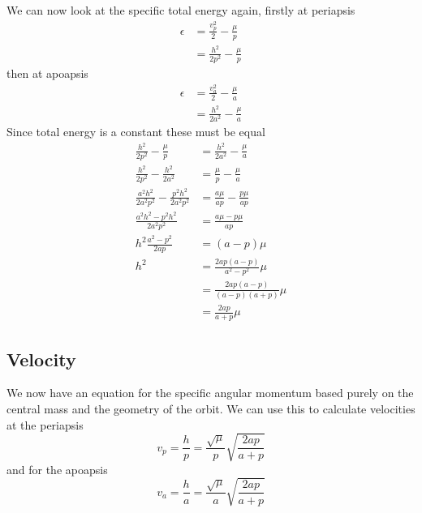 We can now look at the specific total energy again, firstly at periapsis
\begin{align}
\epsilon &= \frac{v_p^2}{2}-\frac{\mu}{p} \nonumber \\
&= \frac{h^2}{2p^2}-\frac{\mu}{p} \label{eq:phys-geom-energy1}
\end{align} 
then at apoapsis
\begin{align}
\epsilon &= \frac{v_a^2}{2}-\frac{\mu}{a} \nonumber \\
&= \frac{h^2}{2a^2}-\frac{\mu}{a}
\end{align} 
Since total energy is a constant these must be equal
\begin{align}
\frac{h^2}{2p^2}-\frac{\mu}{p} &= \frac{h^2}{2a^2}-\frac{\mu}{a} \nonumber \\
\frac{h^2}{2p^2}-\frac{h^2}{2a^2} &= \frac{\mu}{p} -\frac{\mu}{a} \nonumber \\
\frac{a^2h^2}{2a^2p^2}-\frac{p^2h^2}{2a^2p^2} &= \frac{a\mu}{ap} -\frac{p\mu}{ap} \nonumber \\
\frac{a^2h^2-p^2h^2}{2a^2p^2} &= \frac{a\mu-p\mu}{ap} \nonumber \\
h^2 \frac{a^2-p^2}{2 ap} &= (a-p)\mu \nonumber \\
h^2 &= \frac{2ap(a-p)}{a^2-p^2}\mu \nonumber \\
 &= \frac{2ap(a-p)}{(a-p)(a+p)}\mu \nonumber \\
&= \frac{2ap}{a+p}\mu \label{eq:phys-geom1}
\end{align}

\subsection{Velocity}
We now have an equation for the specific angular momentum based purely
on the central mass and the geometry of the orbit. We can use this to
calculate velocities at the periapsis
\begin{equation}
v_p = \frac{h}{p} = \frac{\sqrt{\mu}}{p}\sqrt{\frac{2ap}{a+p}}
\end{equation}
and for the apoapsis
\begin{equation}
v_a = \frac{h}{a} = \frac{\sqrt{\mu}}{a}\sqrt{\frac{2ap}{a+p}}
\end{equation}

